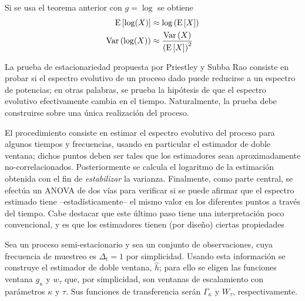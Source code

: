 \begin{corolario}
Si se usa el teorema anterior con $g = \log$ se obtiene
\begin{align}
\mathrm{E}\left[ \log(X) \right] &\approx \log\left( \mathrm{E}\left[ X \right] \right) \\
\mathrm{Var}\left( \log(X) \right) &\approx \frac{\mathrm{Var}\left( X \right)}{\left( \mathrm{E}\left[ X \right] \right)^{2}}
\end{align}
\end{corolario}

La prueba de estacionariedad propuesta por Priestley y Subba Rao \cite{Priestley69} consiste en probar si el espectro evolutivo de un proceso dado puede reducirse a un espectro de potencias; en otras palabras, se prueba la hipótesis de que el espectro evolutivo efectivamente cambia en el tiempo. 
%
Naturalmente, la prueba debe construirse sobre una única realización del proceso.

El procedimiento consiste en estimar el espectro evolutivo del proceso para algunos tiempos y frecuencias, usando en particular el estimador de doble ventana; dichos puntos deben ser tales que los estimadores sean aproximadamente no-correlacionados.
%
Posteriormente se calcula el logaritmo de la estimación obtenida con el fin de \textit{estabilizar} la varianza.
%
Finalmente, como parte central, se efectúa un ANOVA de dos vías para verificar si se puede afirmar que el espectro estimado tiene --estadísticamente-- el mismo valor en los diferentes puntos a través del tiempo.
%
Cabe destacar que este último paso tiene una interpretación poco convencional, y es que los estimadores tienen (por diseño) ciertas propiedades

Sea \xt un proceso semi-estacionario y sea \xtd un conjunto de observaciones, cuya frecuencia de 
muestreo es $\Delta_t=1$ por simplicidad.
%
Usando esta información se construye el estimador de doble ventana, $\widehat{h}$; para ello se eligen las funciones ventana $g_\kappa$ y $w_\tau$ que, por simplicidad, son ventanas de escalamiento con parámetros $\kappa$ y $\tau$. Sus funciones de transferencia serán $\Gamma_\kappa$ y $W_\tau$, respectivamente.

